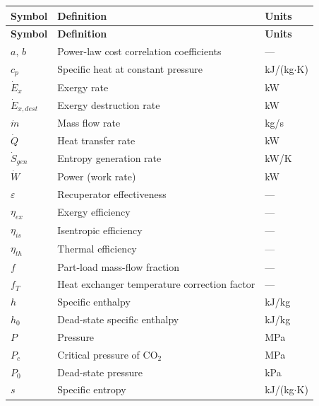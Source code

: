 \begin{longtable}{p{2.8cm} p{7.5cm} p{3.0cm}}
\toprule
\textbf{Symbol} & \textbf{Definition} & \textbf{Units} \\
\midrule
\endfirsthead
\toprule
\textbf{Symbol} & \textbf{Definition} & \textbf{Units} \\
\midrule
\endhead
\bottomrule
\endlastfoot
$a,\,b$              & Power-law cost correlation coefficients    & --- \\
$c_p$                & Specific heat at constant pressure         & kJ/(kg$\cdot$K) \\
$\dot{E}_{x}$        & Exergy rate                                & kW \\
$\dot{E}_{x,dest}$   & Exergy destruction rate                    & kW \\
$\dot{m}$            & Mass flow rate                             & kg/s \\
$\dot{Q}$            & Heat transfer rate                         & kW \\
$\dot{S}_{gen}$      & Entropy generation rate                    & kW/K \\
$\dot{W}$            & Power (work rate)                          & kW \\
$\varepsilon$        & Recuperator effectiveness                  & --- \\
$\eta_{ex}$          & Exergy efficiency                          & --- \\
$\eta_{is}$          & Isentropic efficiency                      & --- \\
$\eta_{th}$          & Thermal efficiency                         & --- \\
$f$                  & Part-load mass-flow fraction               & --- \\
$f_T$                & Heat exchanger temperature correction factor & --- \\
$h$                  & Specific enthalpy                          & kJ/kg \\
$h_0$                & Dead-state specific enthalpy               & kJ/kg \\
$P$                  & Pressure                                   & MPa \\
$P_c$                & Critical pressure of CO$_2$                & MPa \\
$P_0$                & Dead-state pressure                        & kPa \\
$s$                  & Specific entropy                           & kJ/(kg$\cdot$K) \\

\end{longtable}
